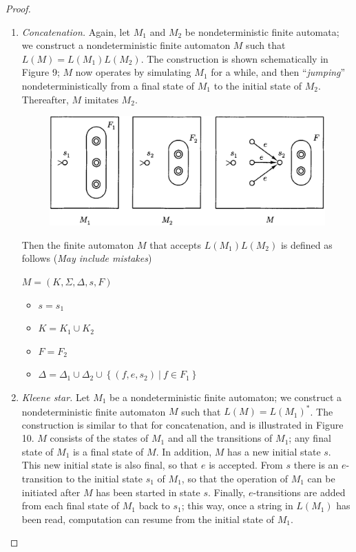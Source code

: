 \begin{proof}
\begin{enumerate}[label=(\alph*)]
    \item \textit{Concatenation.}
    Again, let $M_1$ and $M_2$ be nondeterministic finite automata; we construct a nondeterministic finite automaton $M$ such that $L(M) = L(M_1) L(M_2)$. The construction is shown schematically in Figure 9; $M$ now operates by simulating $M_1$ for a while, and then ``\textit{jumping}'' nondeterministically from a final state of $M_1$ to the initial state of $M_2$. Thereafter, $M$ imitates $M_2$. 

    \begin{figure}[h!]
      \centering
      \includegraphics[width=.5\textwidth]{img/Fig2.12.png}
      \caption{}
    \end{figure}

    Then the finite automaton $M$ that accepts $L(M_1) L(M_2)$ is defined as follows (\textit{May include mistakes})
    
    \quad $M = (K, \Sigma, \Delta, s, F)$
    \begin{itemize}
      \item $s = s_1$
      \item $K = K_1 \cup K_2$
      \item $F = F_2$
      \item $\Delta = \Delta_1 \cup \Delta_2 \cup \left\{ (f,e,s_2)\ |\ f \in F_1 \right\}$
    \end{itemize}

    \item \textit{Kleene star.}
    Let $M_1$ be a nondeterministic finite automaton; we construct a nondeterministic finite automaton $M$ such that $L(M) = L(M_1)^*$. The construction is similar to that for concatenation, and is illustrated in Figure 10. $M$ consists of the states of $M_1$ and all the transitions of $M_1$; any final state of $M_1$ is a final state of $M$. In addition, $M$ has a new initial state $s$. This new initial state is also final, so that $e$ is accepted. From $s$ there is an $e$-transition to the initial state $s_1$ of $M_1$, so that the operation of $M_1$ can be initiated after $M$ has been started in state $s$. Finally, $e$-transitions are added from each final state of $M_1$ back to $s_1$; this way, once a string in $L(M_1)$ has been read, computation can resume from the initial state of $M_1$.


\end{enumerate}
\end{proof}
